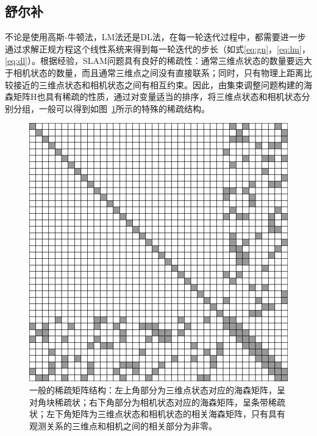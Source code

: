 

\subsection{舒尔补}\label{sec:schur}

不论是使用高斯-牛顿法，LM法还是DL法，在每一轮迭代过程中，都需要进一步通过求解正规方程这个线性系统来得到每一轮迭代的步长（如式\eqref{eq:gn}，\eqref{eq:lm}，\eqref{eq:dl}）。根据经验，SLAM问题具有良好的稀疏性：通常三维点状态的数量要远大于相机状态的数量，而且通常三维点之间没有直接联系；同时，只有物理上距离比较接近的三维点状态和相机状态之间有相互约束。因此，由集束调整问题构建的海森矩阵$\mathrm{H}$也具有稀疏的性质，通过对变量适当的排序，将三维点状态和相机状态分别分组，一般可以得到如图~\ref{fig:sparse_matrix}所示的特殊的稀疏结构。

\begin{figure}[htb!]
    \centering
    \includegraphics[width=.5\textwidth]{Pictures/sparse_matrix.png}
    \caption{一般的稀疏矩阵结构：左上角部分为三维点状态对应的海森矩阵，呈对角块稀疏状；右下角部分为相机状态对应的海森矩阵，呈条带稀疏状；左下角矩阵为三维点状态和相机状态的相关海森矩阵，只有具有观测关系的三维点和相机之间的相关部分为非零。}
    \label{fig:sparse_matrix}
\end{figure}

